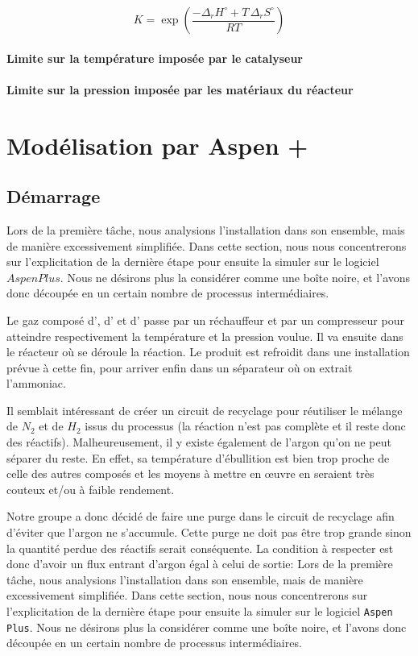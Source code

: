 \documentclass[a4paper, oneside, 12pt]{article}
\begin{document}
\[
K = \exp{\left( \frac{- \Delta_r H^{\circ} + T \, \Delta_r S^{\circ}}{R T}\right)}
\]

\paragraph{Limite sur la température imposée par le catalyseur}

\paragraph{Limite sur la pression imposée par les matériaux du réacteur}

\section{Modélisation par Aspen +}
\subsection{Démarrage}

Lors de la première tâche, nous analysions l'installation dans son ensemble, 
mais de manière excessivement simplifiée. 
Dans cette section, nous nous concentrerons sur l'explicitation de la dernière étape 
pour ensuite la simuler sur le logiciel $Aspen Plus$. 
Nous ne désirons plus la considérer comme une boîte noire, et l'avons donc découpée 
en un certain nombre de processus intermédiaires. 

Le gaz composé d', d' et d' passe par un réchauffeur et par un compresseur 
pour atteindre respectivement la température et la pression voulue. 
Il va ensuite dans le réacteur où se déroule la réaction.
Le produit est refroidit dans une installation prévue à cette fin, 
pour arriver enfin dans un séparateur où on extrait l'ammoniac.

Il semblait intéressant de créer un circuit de recyclage pour réutiliser 
le mélange de $N_2$ et de $H_2$ issus du processus (la réaction n'est pas complète 
et il reste donc des réactifs). Malheureusement, il y existe également de l'argon 
qu'on ne peut séparer du reste. En effet, sa température d'ébullition est bien trop 
proche de celle des autres composés et les moyens à mettre en œuvre en seraient 
très couteux et/ou à faible rendement.

Notre groupe a donc décidé de faire une purge dans le circuit de recyclage 
afin d'éviter que l'argon ne s'accumule. Cette purge ne doit pas être trop 
grande sinon la quantité perdue des réactifs serait conséquente. 
La condition à respecter est donc d'avoir un flux entrant d'argon égal à celui de sortie:
Lors de la première tâche, nous analysions l'installation dans son ensemble, 
mais de manière excessivement simplifiée. Dans cette section, 
nous nous concentrerons sur l'explicitation de la dernière étape pour 
ensuite la simuler sur le logiciel \texttt{Aspen Plus}. 
Nous ne désirons plus la considérer comme une boîte noire, 
et l'avons donc découpée en un certain nombre de processus intermédiaires.
\end{document}
